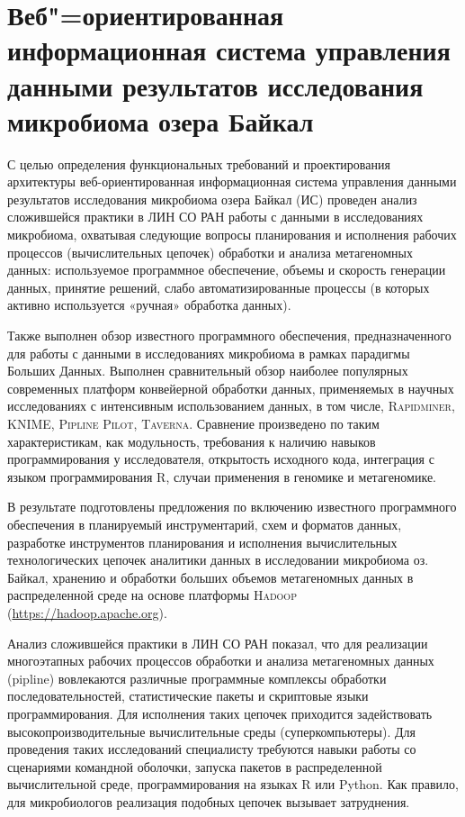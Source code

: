 \documentclass[a4paper,12pt,openany,final]{extreport}
\begin{document}
\chapter{Веб"=ориентированная информационная система управления данными результатов исследования микробиома озера Байкал}\label{chap:6}

С целью определения функциональных требований и проектирования
архитектуры веб-ориентированная информационная система управления
данными результатов исследования микробиома озера Байкал (ИС) проведен
анализ сложившейся практики в ЛИН СО РАН работы с данными в
исследованиях микробиома, охватывая следующие вопросы планирования и
исполнения рабочих процессов (вычислительных цепочек) обработки и
анализа метагеномных данных: используемое программное обеспечение,
объемы и скорость генерации данных, принятие решений, слабо
автоматизированные процессы (в которых активно используется «ручная»
обработка данных).

Также выполнен обзор известного программного обеспечения,
предназначенного для работы с данными в исследованиях микробиома в
рамках парадигмы Больших Данных. Выполнен сравнительный обзор наиболее
популярных современных платформ конвейерной обработки данных,
применяемых в научных исследованиях с интенсивным использованием данных,
в том числе, \textsc{Rapidminer}, \textsc{KNIME}, \textsc{Pipline Pilot},
\textsc{Taverna}. Сравнение произведено по таким характеристикам, как
модульность, требования к наличию навыков программирования у
исследователя, открытость исходного кода, интеграция с языком
программирования R, случаи применения в геномике и метагеномике.

В результате подготовлены предложения по включению известного
программного обеспечения в планируемый инструментарий, схем и форматов
данных, разработке инструментов планирования и исполнения вычислительных
технологических цепочек аналитики данных в исследовании микробиома оз.
Байкал, хранению и обработки больших объемов метагеномных данных в
распределенной среде на основе платформы \textsc{Hadoop}
(\href{https://hadoop.apache.org/}{{https://hadoop.apache.org}}).

Анализ сложившейся практики в ЛИН СО РАН показал, что для реализации
многоэтапных рабочих процессов обработки и анализа метагеномных данных
(pipline) вовлекаются различные программные комплексы обработки
последовательностей, статистические пакеты и скриптовые языки
программирования. Для исполнения таких цепочек приходится задействовать
высокопроизводительные вычислительные среды (суперкомпьютеры). Для
проведения таких исследований специалисту требуются навыки работы со
сценариями командной оболочки, запуска пакетов в распределенной
вычислительной среде, программирования на языках R или Python. Как
правило, для микробиологов реализация подобных цепочек вызывает
затруднения.
\end{document}
